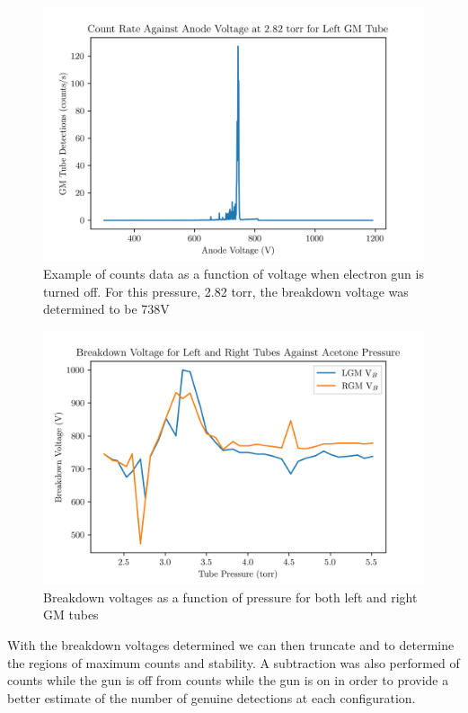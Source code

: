 \begin{figure}[h!]
    \centering
    \includegraphics[scale=0.8]{Figs/example.jpg}
    \caption{Example of counts data as a function of voltage when electron gun is turned off. For this pressure, 2.82 torr, the breakdown voltage was determined to be 738V}
    \label{fig:VB}
\end{figure}

\begin{figure}[h!]
    \centering
    \includegraphics[scale=0.8]{Figs/VB.jpg}
    \caption{Breakdown voltages as a function of pressure for both left and right GM tubes}
    \label{fig:breakdown}
\end{figure}

With the breakdown voltages determined we can then truncate  and  to determine the regions of maximum counts and stability. A subtraction was 
also performed of counts while the gun is off from counts while the gun is on in order to provide a better estimate of the number of genuine detections at each configuration. 

